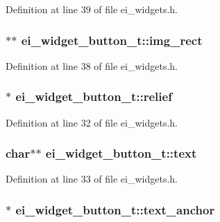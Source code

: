 Definition at line 39 of file ei\-\_\-widgets.\-h.

\hypertarget{structei__widget__button__t_aca8622d6afae914d19abd7c8196b261d}{
\subsubsection[{img\-\_\-rect}]{$\ast$$\ast$ ei\-\_\-widget\-\_\-button\-\_\-t\-::img\-\_\-rect}}\label{structei__widget__button__t_aca8622d6afae914d19abd7c8196b261d}


Definition at line 38 of file ei\-\_\-widgets.\-h.

\hypertarget{structei__widget__button__t_a2e9dea6f5b930ee161a30adb1c19f28c}{
\subsubsection[{relief}]{$\ast$ ei\-\_\-widget\-\_\-button\-\_\-t\-::relief}}\label{structei__widget__button__t_a2e9dea6f5b930ee161a30adb1c19f28c}


Definition at line 32 of file ei\-\_\-widgets.\-h.

\hypertarget{structei__widget__button__t_a88bc50591c237866ef1a195ad72a1585}{
\subsubsection[{text}]{\setlength{\rightskip}{0pt plus 5cm}char$\ast$$\ast$ ei\-\_\-widget\-\_\-button\-\_\-t\-::text}}\label{structei__widget__button__t_a88bc50591c237866ef1a195ad72a1585}


Definition at line 33 of file ei\-\_\-widgets.\-h.

\hypertarget{structei__widget__button__t_a376dc78fad11797c2dbdaa032953e8a5}{
\subsubsection[{text\-\_\-anchor}]{$\ast$ ei\-\_\-widget\-\_\-button\-\_\-t\-::text\-\_\-anchor}}\label{structei__widget__button__t_a376dc78fad11797c2dbdaa032953e8a5}


